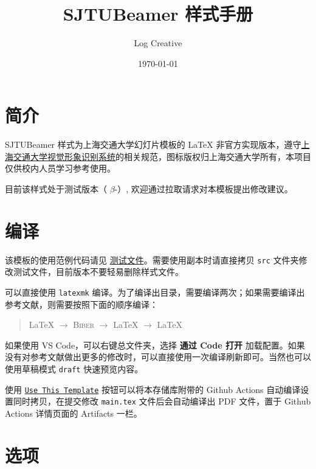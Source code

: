 \documentclass[a4paper,12pt]{article}
\begin{document}
\begin{CJK}{UTF8}{song}
\title{\textsf{SJTUBeamer} 样式手册}
\author{Log Creative}
\date{\today}
\maketitle

\tableofcontents    %

\clearpage

\section{简介}

\textsf{SJTUBeamer} 样式为上海交通大学幻灯片模板的 \LaTeX{} 非官方实现版本，遵守\href{http://vi.sjtu.edu.cn/}{上海交通大学视觉形象识别系统}的相关规范，图标版权归上海交通大学所有，本项目仅供校内人员学习参考使用。

目前该样式处于测试版本（ $\beta$-）, 欢迎通过拉取请求对本模板提出修改建议。

\section{编译}

该模板的使用范例代码请见 \href{https://github.com/LogCreative/SJTUBeamer/blob/main/src/main.tex}{测试文件}。需要使用副本时请直接拷贝 \verb"src" 文件夹修改测试文件，目前版本不要轻易删除样式文件。

可以直接使用 \verb"latexmk" 编译。为了编译出目录，需要编译两次；如果需要编译出参考文献，则需要按照下面的顺序编译：
\begin{quotation}
    \LaTeX{} $\rightarrow$ \textsc{Biber} $\rightarrow$ \LaTeX{} $\rightarrow$ \LaTeX{}
\end{quotation}
如果使用 VS Code，可以右键总文件夹，选择 \textbf{通过 Code 打开} 加载配置。如果没有对参考文献做出更多的修改时，可以直接使用一次编译刷新即可。当然也可以使用草稿模式 \verb"draft" 快速预览内容。

使用 \href{https://github.com/LogCreative/SJTUBeamer/generate}{\texttt{Use This Template}} 按钮可以将本存储库附带的 Github Actions 自动编译设置同时拷贝，在提交修改 \verb"main.tex" 文件后会自动编译出 PDF 文件，置于 Github Actions 详情页面的 Artifacts 一栏。

\section{选项}


\end{CJK}
\end{document}
